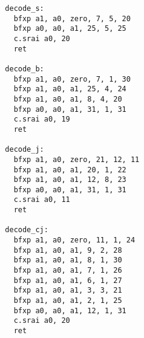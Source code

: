 \begin{multicols}{2}
\begin{verbatim}
  decode_s:
    bfxp a1, a0, zero, 7, 5, 20
    bfxp a0, a0, a1, 25, 5, 25
    c.srai a0, 20
    ret

  decode_b:
    bfxp a1, a0, zero, 7, 1, 30
    bfxp a1, a0, a1, 25, 4, 24
    bfxp a1, a0, a1, 8, 4, 20
    bfxp a0, a0, a1, 31, 1, 31
    c.srai a0, 19
    ret

  decode_j:
    bfxp a1, a0, zero, 21, 12, 11
    bfxp a1, a0, a1, 20, 1, 22
    bfxp a1, a0, a1, 12, 8, 23
    bfxp a0, a0, a1, 31, 1, 31
    c.srai a0, 11
    ret

  decode_cj:
    bfxp a1, a0, zero, 11, 1, 24
    bfxp a1, a0, a1, 9, 2, 28
    bfxp a1, a0, a1, 8, 1, 30
    bfxp a1, a0, a1, 7, 1, 26
    bfxp a1, a0, a1, 6, 1, 27
    bfxp a1, a0, a1, 3, 3, 21
    bfxp a1, a0, a1, 2, 1, 25
    bfxp a0, a0, a1, 12, 1, 31
    c.srai a0, 20
    ret
\end{verbatim}
\end{multicols}
